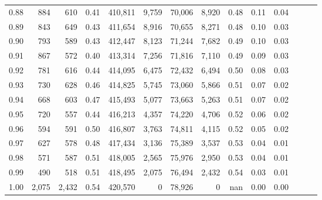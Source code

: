 \begin{tabular}{rrrrrrrrrrrrrr}
0.88 &     884 &    610 &  0.41 &  410,811 &    9,759 &  70,006 &   8,920 &  0.48 &  0.11 &      0.04 \\
0.89 &     843 &    649 &  0.43 &  411,654 &    8,916 &  70,655 &   8,271 &  0.48 &  0.10 &      0.03 \\
0.90 &     793 &    589 &  0.43 &  412,447 &    8,123 &  71,244 &   7,682 &  0.49 &  0.10 &      0.03 \\
0.91 &     867 &    572 &  0.40 &  413,314 &    7,256 &  71,816 &   7,110 &  0.49 &  0.09 &      0.03 \\
0.92 &     781 &    616 &  0.44 &  414,095 &    6,475 &  72,432 &   6,494 &  0.50 &  0.08 &      0.03 \\
0.93 &     730 &    628 &  0.46 &  414,825 &    5,745 &  73,060 &   5,866 &  0.51 &  0.07 &      0.02 \\
0.94 &     668 &    603 &  0.47 &  415,493 &    5,077 &  73,663 &   5,263 &  0.51 &  0.07 &      0.02 \\
0.95 &     720 &    557 &  0.44 &  416,213 &    4,357 &  74,220 &   4,706 &  0.52 &  0.06 &      0.02 \\
0.96 &     594 &    591 &  0.50 &  416,807 &    3,763 &  74,811 &   4,115 &  0.52 &  0.05 &      0.02 \\
0.97 &     627 &    578 &  0.48 &  417,434 &    3,136 &  75,389 &   3,537 &  0.53 &  0.04 &      0.01 \\
0.98 &     571 &    587 &  0.51 &  418,005 &    2,565 &  75,976 &   2,950 &  0.53 &  0.04 &      0.01 \\
0.99 &     490 &    518 &  0.51 &  418,495 &    2,075 &  76,494 &   2,432 &  0.54 &  0.03 &      0.01 \\
1.00 &   2,075 &  2,432 &  0.54 &  420,570 &        0 &  78,926 &       0 &   nan &  0.00 &      0.00 \\
\bottomrule
\end{tabular}
